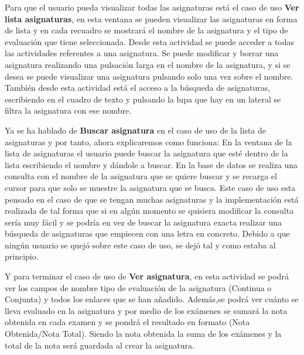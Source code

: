 Para que el usuario pueda visualizar todas las asignaturas está el caso de uso \textbf{Ver lista asignaturas}, en esta ventana se pueden visualizar las asignaturas en forma de lista y en cada recuadro se mostrará el nombre de la asignatura y el tipo de evaluación que tiene seleccionada.
Desde esta actividad se puede acceder a todas las actividades referentes a una asignatura. Se puede modificar y borrar una asignatura realizando una pulsación larga en el nombre de la asignatura, y si se desea se puede visualizar una asignatura pulsando solo una vez sobre el nombre.
También desde esta actividad está el acceso a la búsqueda de asignaturas, escribiendo en el cuadro de texto y pulsando la lupa que hay en un lateral se filtra la asignatura con ese nombre.


Ya se ha hablado de \textbf{Buscar asignatura} en el caso de uso de la lista de asignaturas y por tanto, ahora explicaremos como funciona:
En la ventana de la lista de asignaturas el usuario puede buscar la asignatura que esté dentro de la lista escribiendo el nombre y dándole a buscar.
En la base de datos se realiza una consulta con el nombre de la asignatura que se quiere buscar y se recarga el cursor para que solo se muestre la asignatura que se busca.
Este caso de uso esta pensado en el caso de que se tengan muchas asignaturas y la implementación está realizada de tal forma que si en algún momento se quisiera modificar la consulta sería muy fácil y se podría en vez de buscar la asignatura exacta realizar una búsqueda de asignaturas que empiecen con una letra en concreto.
Debido a que ningún usuario se quejó sobre este caso de uso, se dejó tal y como estaba al principio.

Y para terminar el caso de uso de \textbf{Ver asignatura}, en esta actividad se podrá ver los campos de nombre tipo de evaluación de la asignatura (Continua o Conjunta) y todos los enlaces que se han añadido. Además,se podrá ver cuánto se lleva evaluado en la asignatura y por medio de los exámenes se sumará la nota obtenida en cada examen y se pondrá el resultado en formato (Nota Obtenida/Nota Total).
Siendo la nota obtenida la suma de los exámenes y la total de la nota será guardada al crear la asignatura.



